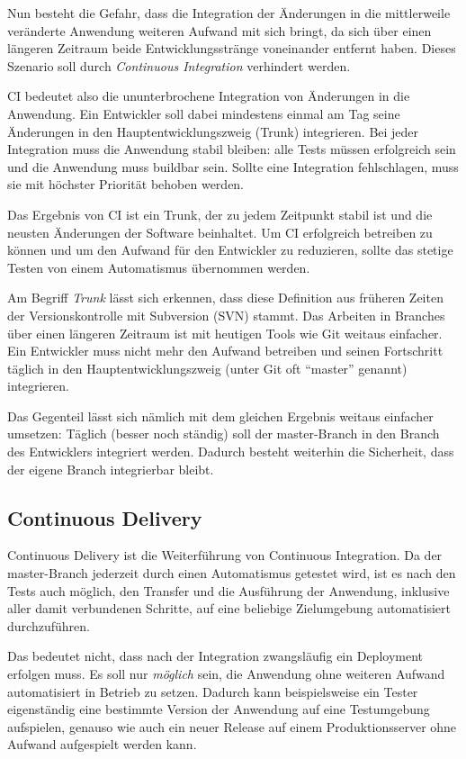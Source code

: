 Nun besteht die Gefahr, dass die Integration der Änderungen in die mittlerweile veränderte Anwendung weiteren Aufwand mit sich bringt, da sich über einen längeren Zeitraum beide Entwicklungsstränge voneinander entfernt haben. Dieses Szenario soll durch \emph{Continuous Integration} verhindert werden.

\ac{CI} bedeutet also die ununterbrochene Integration von Än\-der\-ung\-en in die Anwendung. Ein Entwickler soll dabei mindestens einmal am Tag seine Änderungen in den Hauptentwicklungszweig (Trunk) integrieren. Bei jeder Integration muss die Anwendung stabil bleiben: alle Tests müssen erfolgreich sein und die Anwendung muss buildbar sein. Sollte eine Integration fehlschlagen, muss sie mit höchster Priorität behoben werden. \citep[25ff]{Duvall2007}

Das Ergebnis von \ac{CI} ist ein Trunk, der zu jedem Zeitpunkt stabil ist und die neusten Änderungen der Software beinhaltet. Um \ac{CI} erfolgreich betreiben zu können und um den Aufwand für den Entwickler zu reduzieren, sollte das stetige Testen von einem Automatismus übernommen werden.

Am Begriff \emph{Trunk} lässt sich erkennen, dass diese Definition aus früheren Zeiten der Versionskontrolle mit Subversion (SVN) stammt. Das Arbeiten in Branches über einen längeren Zeitraum ist mit heutigen Tools wie Git weitaus einfacher. Ein Entwickler muss nicht mehr den Aufwand betreiben und seinen Fortschritt täglich in den Hauptentwicklungszweig (unter Git oft ``master'' genannt) integrieren.

Das Gegenteil lässt sich nämlich mit dem gleichen Ergebnis weitaus einfacher umsetzen: Täglich (besser noch ständig) soll der master-Branch in den Branch des Entwicklers integriert werden. Dadurch besteht weiterhin die Sicherheit, dass der eigene Branch integrierbar bleibt.

\subsection{Continuous Delivery}

Continuous Delivery ist die Weiterführung von Continuous Integration. Da der master-Branch jederzeit durch einen Automatismus getestet wird, ist es nach den Tests auch möglich, den Transfer und die Ausführung der Anwendung, inklusive aller damit verbundenen Schritte, auf eine beliebige Zielumgebung automatisiert durchzuführen.

Das bedeutet nicht, dass nach der Integration zwangsläufig ein Deployment erfolgen muss. Es soll nur \emph{möglich} sein, die Anwendung ohne weiteren Aufwand automatisiert in Betrieb zu setzen. Dadurch kann beispielsweise ein Tester eigenständig eine bestimmte Version der Anwendung auf eine Testumgebung aufspielen, genauso wie auch ein neuer Release auf einem Produktionsserver ohne Aufwand aufgespielt werden kann. \citep{FowlerCD}

